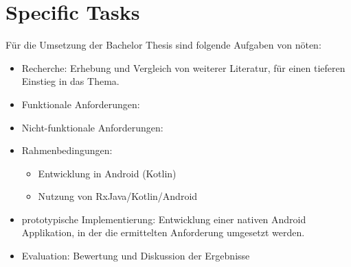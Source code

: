 \section{Specific Tasks}
\label{sec:specific-tasks}

Für die Umsetzung der Bachelor Thesis sind folgende Aufgaben von nöten:
%
\begin{itemize}
    \item Recherche: Erhebung und Vergleich von weiterer Literatur, für einen tieferen Einstieg in das Thema.
    \item Funktionale Anforderungen: 
        \begin{itemize}
        \end{itemize}
    \item Nicht-funktionale Anforderungen:
    \begin{itemize}
    \end{itemize}
    \item Rahmenbedingungen:
    \begin{itemize}
        \item Entwicklung in Android (Kotlin)
        \item Nutzung von RxJava/Kotlin/Android
    \end{itemize}
    \item prototypische Implementierung: Entwicklung einer nativen Android Applikation, in der 
    die ermittelten Anforderung umgesetzt werden.
    \item Evaluation: Bewertung und Diskussion der Ergebnisse
\end{itemize}